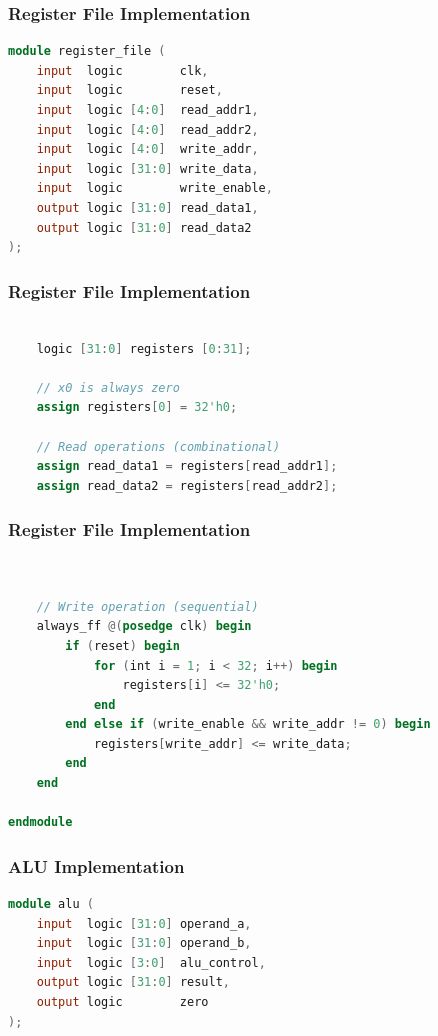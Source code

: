 \documentclass[aspectratio=169,xcolor=dvipsnames]{beamer}
\begin{document}
\begin{frame}[fragile]
\frametitle{Register File Implementation}
\begin{lstlisting}[language=Verilog]
module register_file (
    input  logic        clk,
    input  logic        reset,
    input  logic [4:0]  read_addr1,
    input  logic [4:0]  read_addr2,
    input  logic [4:0]  write_addr,
    input  logic [31:0] write_data,
    input  logic        write_enable,
    output logic [31:0] read_data1,
    output logic [31:0] read_data2
);

\end{lstlisting}
\end{frame}

\begin{frame}[fragile]
\frametitle{Register File Implementation}
\begin{lstlisting}[language=Verilog]

    logic [31:0] registers [0:31];

    // x0 is always zero
    assign registers[0] = 32'h0;

    // Read operations (combinational)
    assign read_data1 = registers[read_addr1];
    assign read_data2 = registers[read_addr2];

\end{lstlisting}
\end{frame}

\begin{frame}[fragile]
\frametitle{Register File Implementation}
\begin{lstlisting}[language=Verilog]


    // Write operation (sequential)
    always_ff @(posedge clk) begin
        if (reset) begin
            for (int i = 1; i < 32; i++) begin
                registers[i] <= 32'h0;
            end
        end else if (write_enable && write_addr != 0) begin
            registers[write_addr] <= write_data;
        end
    end

endmodule
\end{lstlisting}
\end{frame}


\begin{frame}[fragile]
\frametitle{ALU Implementation}
\begin{lstlisting}[language=Verilog]
module alu (
    input  logic [31:0] operand_a,
    input  logic [31:0] operand_b,
    input  logic [3:0]  alu_control,
    output logic [31:0] result,
    output logic        zero
);
\end{lstlisting}
\end{frame}
\end{document}
